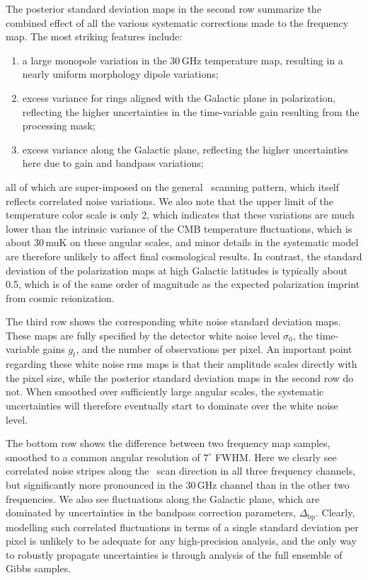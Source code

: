 \documentclass[twocolumn]{aa}
\begin{document}
The posterior standard deviation maps in the second row summarize the
combined effect of all the various systematic corrections made to the
frequency map. The most striking features include:
\begin{enumerate}
  \item a large monopole variation in the 30\,GHz temperature map,
    resulting in a nearly uniform morphology dipole variations;
  \item excess variance for rings aligned with the Galactic plane in
    polarization, reflecting the higher uncertainties in the
    time-variable gain resulting from the processing mask;
  \item excess variance along the Galactic plane, reflecting the
    higher uncertainties here due to gain and bandpass variations;
\end{enumerate}
all of which are super-imposed on the general \Planck\ scanning
pattern, which itself reflects correlated noise variations. We also
note that the upper limit of the temperature color scale is only
2\muK, which indicates that these variations are much lower than the
intrinsic variance of the CMB temperature fluctuations, which is about
30\,muK on these angular scales, and minor details in the systematic
model are therefore unlikely to affect final cosmological results. In
contrast, the standard deviation of the polarization maps at high
Galactic latitudes is typically about 0.5\muK, which is of the same
order of magnitude as the expected polarization imprint from cosmic
reionization. 



The third row shows the corresponding white noise standard deviation
maps. These maps are fully specified by the detector white noise level
$\sigma_0$, the time-variable gains $g_t$, and the number of
observations per pixel. An important point regarding these white noise
rms maps is that their amplitude scales directly with the pixel size,
while the posterior standard deviation maps in the second row do
not. When smoothed over sufficiently large angular scales, the
systematic uncertainties will therefore eventually start to dominate
over the white noise level. 

The bottom row shows the difference between two frequency map samples,
smoothed to a common angular resolution of $7^{\circ}$ FWHM. Here we
clearly see correlated noise stripes along the \Planck\ scan direction
in all three frequency channels, but significantly more pronounced in
the 30\,GHz channel than in the other two frequencies. We also see
fluctuations along the Galactic plane, which are dominated by
uncertainties in the bandpass correction parameters,
$\Delta_{\mathrm{bp}}$. Clearly, modelling such correlated
fluctuations in terms of a single standard deviation per pixel is
unlikely to be adequate for any high-precision analysis, and the only
way to robustly propagate uncertainties is through analysis of the
full ensemble of Gibbs samples.
\end{document}
